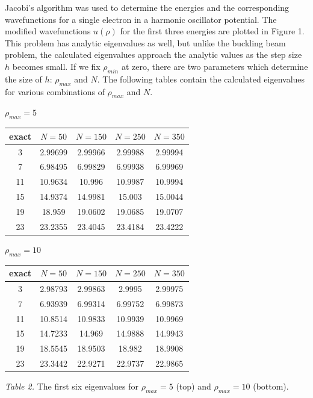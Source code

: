 \documentclass[prb,aps,twocolumn,showpacs,10pt]{revtex4-1}
\begin{document}
Jacobi's algorithm was used to determine the energies and the corresponding wavefunctions for a single electron in a harmonic oscillator potential. The modified wavefunctions $u(\rho)$ for the first three energies are plotted in Figure 1. This problem has analytic eigenvalues as well, but unlike the buckling beam problem, the calculated eigenvalues approach the analytic values as the step size $h$ becomes small. If we fix $\rho_{min}$ at zero, there are two parameters which determine the size of $h$: $\rho_{max}$ and $N$. The following tables contain the calculated eigenvalues for various combinations of $\rho_{max}$ and $N$. 

\begin{center}
$\rho_{max} = 5$\\
\begin{tabular}{|c|c|c|c|c|}
\hline
exact & $N=50$ & $N=150$& $N=250$& $N=350$\\
\hline
\hline
3 & 2.99699&2.99966 & 2.99988 & 2.99994\\
\hline
7 & 6.98495 & 6.99829 & 6.99938 & 6.99969\\
\hline
11 & 10.9634 & 10.996 & 10.9987 & 10.9994\\
\hline
15 & 14.9374&14.9981 & 15.003 & 15.0044\\
\hline
19 & 18.959 & 19.0602 & 19.0685 & 19.0707\\
\hline
23 & 23.2355 & 23.4045 & 23.4184 & 23.4222\\
\hline
\end{tabular}
\vspace*{3mm}

$\rho_{max} = 10$\\
\begin{tabular}{|c|c|c|c|c|}
\hline
exact & $N=50$ & $N=150$& $N=250$& $N=350$\\
\hline
\hline
3 & 2.98793&2.99863 & 2.9995 & 2.99975\\
\hline
7 & 6.93939 & 6.99314 & 6.99752 & 6.99873\\
\hline
11 & 10.8514 & 10.9833 & 10.9939 & 10.9969\\
\hline
15 & 14.7233 &14.969 & 14.9888 & 14.9943\\
\hline
19 & 18.5545 & 18.9503 & 18.982 & 18.9908\\
\hline
23 & 23.3442 & 22.9271 & 22.9737 & 22.9865\\
\hline
\end{tabular}
\vspace*{3mm}

\textit{Table 2.} The first six eigenvalues for $\rho_{max} = 5$ (top) and $\rho_{max} = 10$ (bottom).
\vspace*{2mm}
\end{center}
\end{document}
